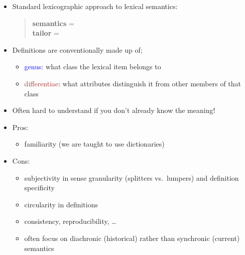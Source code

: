 \documentclass[a4paper,landscape,headrule,footrule,xetex]{foils}
\begin{document}


\begin{itemize}
\item Standard lexicographic approach to lexical semantics:
  \begin{quote}
    \textbf{semantics} = \\
    \textbf{tailor} = 
  \end{quote}
\item Definitions are conventionally made up of;
  \begin{itemize}
  \item \textcolor{blue}{genus}: what class the lexical item belongs to
  \item \textcolor{brown}{differentiae}: what attributes distinguish it from
  other members of that class
\end{itemize}
\item Often hard to understand if you don't already know the meaning!
\item Pros:
  \begin{itemize}
  \item familiarity (we are taught to use dictionaries)
  \end{itemize}
\item Cons:
  \begin{itemize}
  \item subjectivity in sense granularity (splitters vs.\ lumpers) and
    definition specificity
  \item circularity in definitions
  \item consistency, reproducibility, \ldots
  \item often focus on diachronic (historical) rather than synchronic (current) semantics 
  \end{itemize}
\end{itemize}
\end{document}
